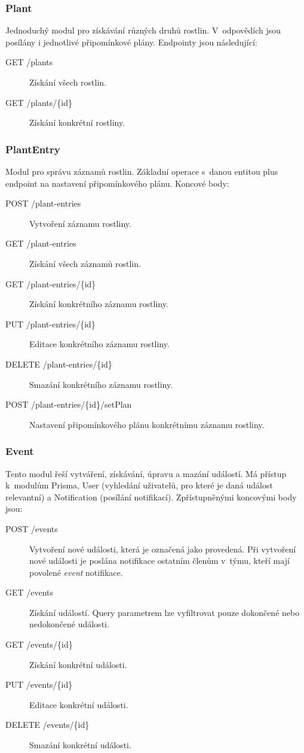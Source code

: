 \documentclass[thesis=M,czech]{FITthesis}[2019/12/23]
\begin{document}
\subsubsection{Plant}
Jednoduchý modul pro získávání různých druhů rostlin. V~odpovědích jsou posílány i jednotlivé připomínkové plány. Endpointy jsou následující:

\begin{description}
    \item[GET /plants] Získání všech rostlin.
    \item[GET /plants/\{id\}] Získání konkrétní rostliny.
\end{description}

\subsubsection{PlantEntry}
Modul pro správu záznamů rostlin. Základní operace s~danou entitou plus endpoint na nastavení připomínkového plánu. Koncové body:

\begin{description}
    \item[POST /plant-entries] Vytvoření záznamu rostliny.
    \item[GET /plant-entries] Získání všech záznamů rostlin.
    \item[GET /plant-entries/\{id\}] Získání konkrétního záznamu rostliny.
    \item[PUT /plant-entries/\{id\}] Editace konkrétního záznamu rostliny.
    \item[DELETE /plant-entries/\{id\}] Smazání konkrétního záznamu rostliny.
    \item[POST /plant-entries/\{id\}/setPlan] Nastavení připomínkového plánu konkrétnímu záznamu rostliny.
\end{description}

\subsubsection{Event}
Tento modul řeší vytváření, získávání, úpravu a mazání událostí. Má přístup k~modulům Prisma, User (vyhledání uživatelů, pro které je daná událost relevantní) a Notification (posílání notifikací). Zpřístupněnými koncovými body jsou:

\begin{description}
    \item[POST /events] Vytvoření nové události, která je označená jako provedená.  Při vytvoření nové události je poslána notifikace ostatním členům v~týmu, kteří mají povolené \textit{event} notifikace.
    \item[GET /events] Získání událostí. Query parametrem lze vyfiltrovat pouze dokončené nebo nedokončené události.
    \item[GET /events/\{id\}] Získání konkrétní události.
    \item[PUT /events/\{id\}] Editace konkrétní události.
    \item[DELETE /events/\{id\}] Smazání konkrétní události.
\end{description}
\end{document}
